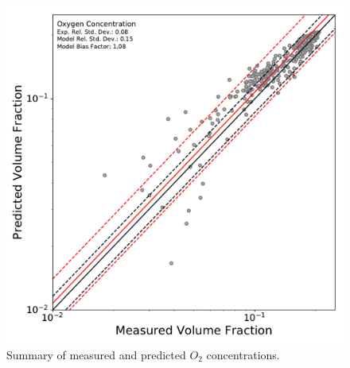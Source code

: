 \begin{figure}[!h]
	\centering
	\includegraphics[width=\columnwidth]{Figures/Plots/Validation/Gas_Concentration/loglog_O2}
	\caption{Summary of measured and predicted $O_2$ concentrations.}
	\label{fig:loglog_O2}
\end{figure}

\FloatBarrier

